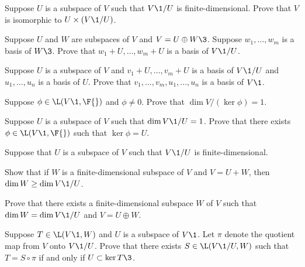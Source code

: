 \exercise
Suppose $U$ is a subspace of $V$ such that $V\1/U$ is finite-dimensional. Prove that $V$ is isomorphic to
$U \times (V\1/U)$.


\exercise
Suppose $U$ and $W$ are subspaces of $V$ and $V = U \oplus W\3$. Suppose $w_1, \ldots, w_m$ is a basis of $W\3$. Prove that
$w_1 + U, \ldots, w_m + U$ is a basis of $V\1/U$.


\exercise
Suppose $U$ is a subspace of $V$ and $v_1 + U, \dots, v_m + U$ is a basis of $V\1/U$ and $u_1, \dots, u_n$ is a basis of $U$. Prove that $v_1, \dots, v_m, u_1, \dots, u_n$ is a basis of $V\1$. \label{basisUVmodU}


\exercise
Suppose $\phi \in \L(V\1, \F{})$ and $\phi \ne 0$. Prove that $\dim V \!/\! (\ker \phi) = 1$.


\exercise
Suppose $U$ is a subspace of $V$ such that $\dim V\1/U = 1$. Prove that there exists $\phi \in \L(V\1, \F{})$ such that $\ker \phi = U$.


\exercise
Suppose that $U$ is a subspace of $V$ such that $V\1/U$ is finite-dimensional.
\begin{subtheorem}
\item
Show that if $W$ is a finite-dimensional subspace of $V$ and \mbox{$V = U + W$}, then $\dim W \ge \dim V\1/U$.
\item
Prove that there exists a finite-dimensional subspace $W$ of $V$ such that \mbox{$\dim W = \dim V\1/U$} and \mbox{$V = U \oplus W$}.
\end{subtheorem}
\exercisesubtheoremend


\exercise
Suppose $T \in \L(V\1, W)$ and $U$ is a subspace of $V\1$. Let $\pi$ denote the quotient map from $V$ onto $V\1/U$. Prove that there exists $S \in \L(V\1/U, W)$ such that $T = S \circ \pi$ if and only if $U \subset \ker T\3$. \label{1715}

